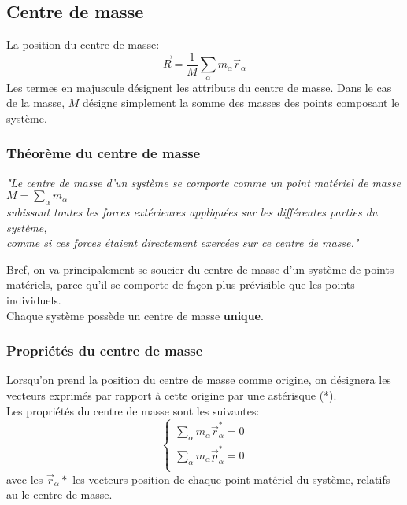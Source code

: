 \documentclass{article}
\numberwithin{equation}{section}
\begin{document}
\subsection{Centre de masse}
La position du centre de masse:
\begin{equation}
	\boxed{ \vec R = \frac{1}{M} \sum_\alpha m_\alpha \vec r_\alpha }
\end{equation}
Les termes en majuscule désignent les attributs du centre de masse. Dans le cas de la masse, \(M\) désigne simplement la somme des masses des points composant le système.

\subsubsection{Théorème du centre de masse}
\begin{center}
	\emph{"Le centre de masse d'un système se comporte comme un point matériel de masse \(M = \sum_\alpha m_\alpha\) \\ subissant toutes les forces extérieures appliquées sur les différentes parties du système, \\ comme si ces forces étaient directement exercées sur ce centre de masse."}
\end{center}
Bref, on va principalement se soucier du centre de masse d'un système de points matériels, parce qu'il se comporte de façon plus prévisible que les points individuels. \\
Chaque système possède un centre de masse \textbf{unique}.

\subsubsection{Propriétés du centre de masse}
Lorsqu'on prend la position du centre de masse comme origine, on désignera les vecteurs exprimés par rapport à cette origine par une astérisque (*). \\

Les propriétés du centre de masse sont les suivantes:
\begin{equation}
	\begin{cases}
		\sum_\alpha m_\alpha \vec r_\alpha^* = 0 \\
		\sum_\alpha m_\alpha \vec p_\alpha^* =0 \\
	\end{cases}
\end{equation} 
avec les \(\vec r_\alpha *\) les vecteurs position de chaque point matériel du système, relatifs au le centre de masse.
\end{document}
